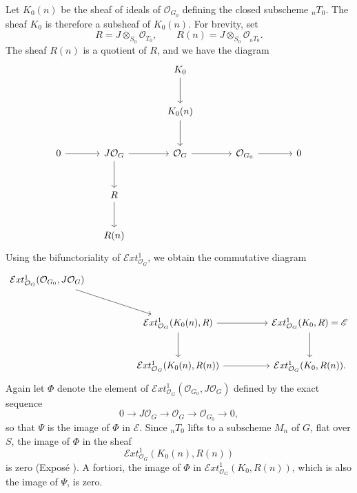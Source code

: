 Let \(K_0(n)\) be the sheaf of ideals of \(\mathcal O_{G_0}\)
defining the closed subscheme \({}_nT_0\). The sheaf
\(K_0\) is
therefore a subsheaf of \(K_0(n)\). For brevity, set
\[
  R=J\otimes_{S_0}\mathcal O_{T_0},
  \qquad
  R(n)=J\otimes_{S_0}\mathcal O_{{}_nT_0}.
\]
The sheaf \(R(n)\) is a quotient of \(R\), and we have the diagram
\[
\begin{tikzcd}[column sep=large,row sep=large]
&& K_0 \arrow[d] \\
&& K_0(n) \arrow[d] \\
0 \arrow[r]
  & J\mathcal O_G \arrow[r] \arrow[d]
  & \mathcal O_G \arrow[r]
  & \mathcal O_{G_0} \arrow[r] & 0 \\
  & R \arrow[d] \\
  & R(n)
\end{tikzcd}
\]
Using the bifunctoriality of
\(\mathcal{E}xt^{1}_{\mathcal O_G}\), we obtain the commutative
diagram
\[
\begin{tikzcd}[column sep=huge,row sep=large]
\mathcal{E}xt^{1}_{\mathcal O_G}
  (\mathcal O_{G_0},J\mathcal O_G)
  \arrow[dr] \\
&
\mathcal{E}xt^{1}_{\mathcal O_G}(K_0(n),R)
  \arrow[r] \arrow[d]
&
\mathcal{E}xt^{1}_{\mathcal O_G}(K_0,R)=\mathscr E
  \arrow[d] \\
&
\mathcal{E}xt^{1}_{\mathcal O_G}(K_0(n),R(n))
  \arrow[r]
&
\mathcal{E}xt^{1}_{\mathcal O_G}(K_0,R(n)).
\end{tikzcd}
\]
Again let \(\Phi\) denote the element of
\(\mathcal{E}xt^{1}_{\mathcal O_G}
(\mathcal O_{G_0},J\mathcal O_G)\) defined by the exact sequence
\[
  0\longrightarrow J\mathcal O_G
  \longrightarrow\mathcal O_G
  \longrightarrow\mathcal O_{G_0}
  \longrightarrow0,
\]
so that \(\Psi\) is the image of \(\Phi\) in \(\mathscr E\). Since
\({}_nT_0\) lifts to a subscheme \(M_n\) of \(G\), flat over \(S\),
the image of \(\Phi\) in the sheaf
\[
  \mathcal{E}xt^{1}_{\mathcal O_G}(K_0(n),R(n))
\]
is zero (Exposé ). A fortiori, the image of \(\Phi\) in
\(\mathcal{E}xt^{1}_{\mathcal O_G}(K_0,R(n))\), which is also
the image of \(\Psi\), is zero.


